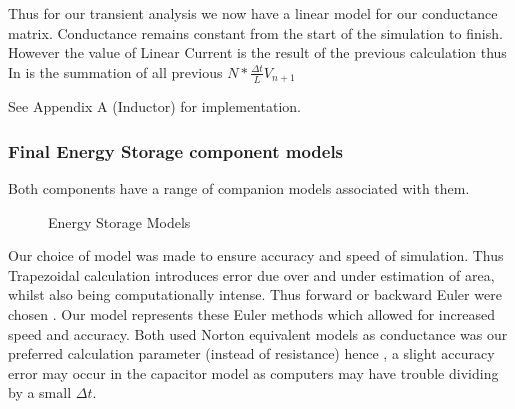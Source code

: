 \documentclass{article}
\begin{document}
\bigbreak

Thus for our transient analysis we now have a linear model for our conductance matrix. Conductance remains constant from the start of the simulation to finish. However the value of Linear Current is the result of the previous calculation thus In is the summation of all previous $ N * \frac{\Delta t}{L}V_{n+1}$

\bigbreak

See Appendix A (Inductor) for implementation.

\newpage

\subsubsection{Final Energy Storage component models}
Both components have a range of companion models associated with them. 

\begin{figure}[h]%
    \centering
    \qquad
    \caption{Energy Storage Models}%
    \label{fig:example}%
\end{figure}

Our choice of model was made to ensure accuracy and speed of simulation. Thus Trapezoidal calculation introduces error due over and under estimation of area, whilst also being computationally intense. Thus forward or backward Euler were chosen . Our model represents these Euler methods which allowed for increased speed and accuracy. Both used Norton equivalent models as conductance was our preferred calculation parameter (instead of resistance) hence , a slight accuracy error may occur in the capacitor model as computers may have trouble dividing by a small $\Delta t$.
\end{document}
